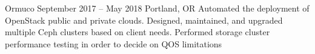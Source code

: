 {Ormuco}
{September 2017 -- May 2018}
{Portland, OR}
{Automated the deployment of OpenStack public and private clouds. Designed, maintained, and upgraded multiple Ceph clusters based on client needs.  Performed storage cluster performance testing in order to decide on QOS limitations}
